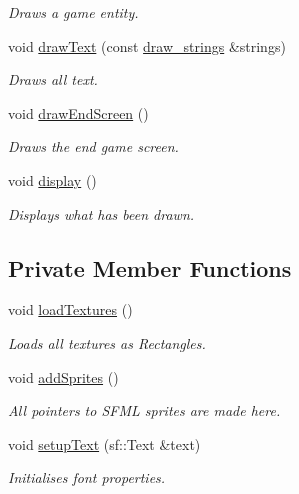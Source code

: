 \begin{DoxyCompactItemize}
\begin{DoxyCompactList}\small\item\em Draws a game entity. \end{DoxyCompactList}\item 
void \hyperlink{classDisplay_a37aef4a33faf48a6f0c777290f5334ce}{draw\-Text} (const \hyperlink{structdraw__strings}{draw\-\_\-strings} \&strings)
\begin{DoxyCompactList}\small\item\em Draws all text. \end{DoxyCompactList}\item 
void \hyperlink{classDisplay_afe5f3569e0746afdb6d3f82fadc123a9}{draw\-End\-Screen} ()
\begin{DoxyCompactList}\small\item\em Draws the end game screen. \end{DoxyCompactList}\item 
void \hyperlink{classDisplay_aa3ab70ec7b76fa3ed139d19e53e72283}{display} ()
\begin{DoxyCompactList}\small\item\em Displays what has been drawn. \end{DoxyCompactList}\end{DoxyCompactItemize}
\subsection*{Private Member Functions}
\begin{DoxyCompactItemize}
\item 
void \hyperlink{classDisplay_a5af58e6a5eea9fcf573d2554891de781}{load\-Textures} ()
\begin{DoxyCompactList}\small\item\em Loads all textures as Rectangles. \end{DoxyCompactList}\item 
void \hyperlink{classDisplay_a410deedeb944684de238030348d3feab}{add\-Sprites} ()
\begin{DoxyCompactList}\small\item\em All pointers to S\-F\-M\-L sprites are made here. \end{DoxyCompactList}\item 
void \hyperlink{classDisplay_ad831893d7d3656e456c7f5c6915701f1}{setup\-Text} (sf\-::\-Text \&text)
\begin{DoxyCompactList}\small\item\em Initialises font properties. \end{DoxyCompactList}\end{DoxyCompactItemize}

